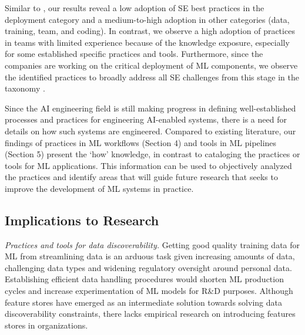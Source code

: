 




Similar to \cite{Serban2020Practices}, our results reveal a low adoption of SE best practices in the deployment category and a medium-to-high adoption in other categories (data, training, team, and coding). In contrast, we observe a high adoption of practices in teams with limited experience because of the knowledge exposure, especially for some established specific practices and tools. Furthermore, since the companies are working on the critical deployment of ML components, we observe the identified practices to broadly address all SE challenges from this stage in the taxonomy \cite{Lwakatare2019}. 

Since the AI engineering field is still making progress in defining well-established processes and practices for engineering AI-enabled systems, there is a need for details on how such systems are engineered. Compared to existing literature, our findings of practices in ML workflows (Section 4) and tools in ML pipelines (Section 5) present the ‘how’ knowledge, in contrast to cataloging the practices or tools for ML applications. This information can be used to objectively analyzed the practices and identify areas that will guide future research that seeks to improve the development of ML systems in practice.

\subsection{Implications to Research}
\textit{Practices and tools for data discoverability.} Getting good quality training data for ML from streamlining data is an arduous task given increasing amounts of data, challenging data types and widening regulatory oversight around personal data. Establishing efficient data handling procedures would shorten ML production cycles and increase experimentation of ML models for R\&D purposes. Although feature stores have emerged as an intermediate solution towards solving data discoverability constraints, there lacks empirical research on introducing features stores in organizations.

